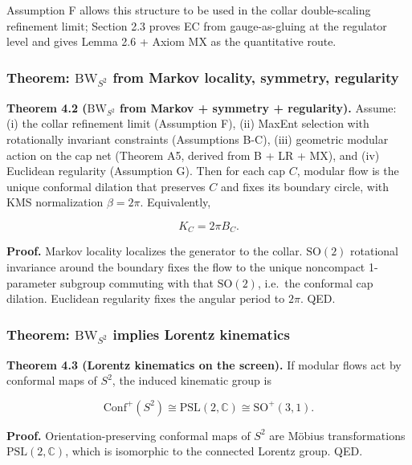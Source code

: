 \documentclass[11pt,a4paper]{article}
\theoremstyle{remark}
\begin{document}
Assumption F allows this structure to be used in the collar double-scaling
refinement limit; Section 2.3 proves EC from gauge-as-gluing at the regulator
level and gives Lemma 2.6 + Axiom MX as the quantitative route.

\subsubsection{\texorpdfstring{Theorem: \(\mathrm{BW}_{S^2}\) from Markov locality, symmetry, regularity}{Theorem: \textbackslash mathrm\{BW\}\_\{S\^{}2\} from Markov locality, symmetry, regularity}}\label{theorem-mathrmbw_s2-from-markov-locality-symmetry-regularity}

\textbf{Theorem 4.2 (\(\mathrm{BW}_{S^2}\) from Markov + symmetry + regularity).} Assume: (i)
the collar refinement limit (Assumption F), (ii) MaxEnt selection with
rotationally invariant constraints (Assumptions B-C), (iii) geometric modular
action on the cap net (Theorem A5, derived from B + LR + MX), and (iv) Euclidean
regularity (Assumption G). Then for each cap \(C\), modular flow is the unique
conformal dilation that preserves \(C\) and fixes its boundary circle, with KMS
normalization \(\beta = 2\pi\). Equivalently,

\[
K_C = 2 \pi B_C.
\]

\textbf{Proof.} Markov locality localizes the generator to the collar. \(\mathrm{SO}(2)\)
rotational invariance around the boundary fixes the flow to the unique
noncompact 1-parameter subgroup commuting with that \(\mathrm{SO}(2)\), i.e.~the
conformal cap dilation. Euclidean regularity fixes the angular period to
\(2\pi\). QED.

\subsubsection{\texorpdfstring{Theorem: \(\mathrm{BW}_{S^2}\) implies Lorentz kinematics}{Theorem: \textbackslash mathrm\{BW\}\_\{S\^{}2\} implies Lorentz kinematics}}\label{theorem-mathrmbw_s2-implies-lorentz-kinematics}

\textbf{Theorem 4.3 (Lorentz kinematics on the screen).} If modular flows act by
conformal maps of \(S^2\), the induced kinematic group is

\[
\mathrm{Conf}^+(S^2) \cong \mathrm{PSL}(2,\mathbb C) \cong \mathrm{SO}^+(3,1).
\]

\textbf{Proof.} Orientation-preserving conformal maps of \(S^2\) are M\"obius
transformations \(\mathrm{PSL}(2,\mathbb{C})\), which is isomorphic to the connected Lorentz
group. QED.
\end{document}
